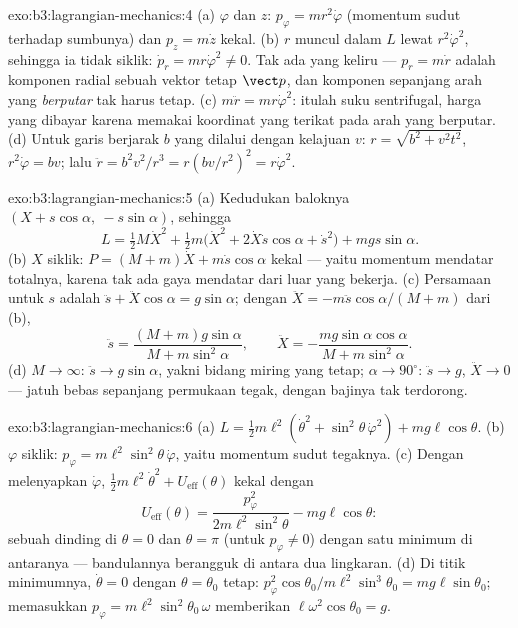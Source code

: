 \begin{solution}{exo:b3:lagrangian-mechanics:4}
(a) $\varphi$ dan $z$: $p_\varphi = mr^2\dot\varphi$ (momentum sudut
terhadap sumbunya) dan $p_z = m\dot z$ kekal. (b) $r$ muncul dalam
$L$ lewat $r^2\dot\varphi^2$, sehingga ia tidak siklik: $\dot p_r =
mr\dot\varphi^2 \neq 0$. Tak ada yang keliru --- $p_r = m\dot r$ adalah
komponen radial sebuah vektor tetap $\vect p$, dan komponen sepanjang
arah yang \emph{berputar} tak harus tetap. (c) $m\ddot r =
mr\dot\varphi^2$: itulah suku sentrifugal, harga yang dibayar karena
memakai koordinat yang terikat pada arah yang berputar. (d) Untuk garis
berjarak $b$ yang dilalui dengan kelajuan $v$: $r = \sqrt{b^2 + v^2t^2}$,
$r^2\dot\varphi = bv$; lalu $\ddot r = b^2v^2/r^3 = r(bv/r^2)^2 = r\dot\varphi^2$.
\end{solution}

\begin{solution}{exo:b3:lagrangian-mechanics:5}
(a) Kedudukan baloknya $(X + s\cos\alpha,\ -s\sin\alpha)$, sehingga
\[
L = \tfrac12 M\dot X^2 + \tfrac12 m\big(\dot X^2 +
2\dot X\dot s\cos\alpha + \dot s^2\big) + mgs\sin\alpha .
\]
(b) $X$ siklik: $P = (M + m)\dot X + m\dot s\cos\alpha$ kekal --- yaitu
momentum mendatar totalnya, karena tak ada gaya mendatar dari luar yang
bekerja. (c) Persamaan untuk $s$ adalah $\ddot s + \ddot
X\cos\alpha = g\sin\alpha$; dengan $\ddot X = -m\ddot s\cos\alpha/(M +
m)$ dari (b),
\[
\ddot s = \frac{(M + m)g\sin\alpha}{M + m\sin^2\alpha} , \qquad
\ddot X = -\frac{mg\sin\alpha\cos\alpha}{M + m\sin^2\alpha} .
\]
(d) $M \to \infty$: $\ddot s \to g\sin\alpha$, yakni bidang miring yang
tetap; $\alpha \to 90^\circ$: $\ddot s \to g$, $\ddot X \to 0$ --- jatuh
bebas sepanjang permukaan tegak, dengan bajinya tak terdorong.
\end{solution}

\begin{solution}{exo:b3:lagrangian-mechanics:6}
(a) $L = \tfrac12 m\ell^2(\dot\theta^2 + \sin^2\theta\,\dot\varphi^2) +
mg\ell\cos\theta$. (b) $\varphi$ siklik: $p_\varphi =
m\ell^2\sin^2\theta\,\dot\varphi$, yaitu momentum sudut tegaknya. (c)
Dengan melenyapkan $\dot\varphi$, $\tfrac12 m\ell^2\dot\theta^2 +
U_{\text{eff}}(\theta)$ kekal dengan
\[
U_{\text{eff}}(\theta) = \frac{p_\varphi^2}{2m\ell^2\sin^2\theta}
 - mg\ell\cos\theta :
\]
sebuah dinding di $\theta = 0$ dan $\theta = \pi$ (untuk $p_\varphi \neq 0$)
dengan satu minimum di antaranya --- bandulannya berangguk di antara dua
lingkaran. (d) Di titik minimumnya, $\dot\theta = 0$ dengan
$\theta = \theta_0$ tetap:
$p_\varphi^2\cos\theta_0/m\ell^2\sin^3\theta_0 = mg\ell\sin\theta_0$;
memasukkan $p_\varphi = m\ell^2\sin^2\theta_0\,\omega$ memberikan
$\ell\omega^2\cos\theta_0 = g$.
\end{solution}

